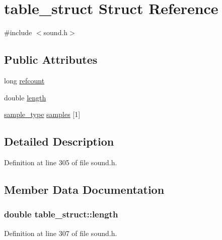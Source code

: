 \hypertarget{structtable__struct}{}\section{table\+\_\+struct Struct Reference}
\label{structtable__struct}


{\ttfamily \#include $<$sound.\+h$>$}

\subsection*{Public Attributes}
\begin{DoxyCompactItemize}
\item 
long \hyperlink{structtable__struct_a492ae650461bb95519dbdf8a968e08f7}{refcount}
\item 
double \hyperlink{structtable__struct_a11559931dbab7189ae415a901b7d2341}{length}
\item 
\hyperlink{sound_8h_a3a9d1d4a1c153390d2401a6e9f71b32c}{sample\+\_\+type} \hyperlink{structtable__struct_af21c66b00f0ce30f3f0b0c7d2405c988}{samples} \mbox{[}1\mbox{]}
\end{DoxyCompactItemize}


\subsection{Detailed Description}


Definition at line 305 of file sound.\+h.



\subsection{Member Data Documentation}
\subsubsection[{\texorpdfstring{length}{length}}]{\setlength{\rightskip}{0pt plus 5cm}double table\+\_\+struct\+::length}\hypertarget{structtable__struct_a11559931dbab7189ae415a901b7d2341}{}\label{structtable__struct_a11559931dbab7189ae415a901b7d2341}


Definition at line 307 of file sound.\+h.

